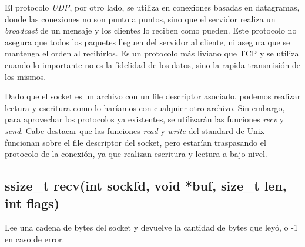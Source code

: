 \documentclass[oneside]{article}
\numberwithin{equation}{section}
\numberwithin{figure}{section}
\numberwithin{table}{section}
\begin{document}
		El protocolo \emph{UDP}, por otro lado, se utiliza en conexiones basadas en datagramas, donde las conexiones no son punto a puntos, sino que el servidor realiza un \emph{broadcast} de un mensaje y los clientes lo reciben como pueden. Este protocolo no asegura que todos los paquetes lleguen del servidor al cliente, ni asegura que se mantenga el orden al recibirlos. Es un protocolo más liviano que TCP y se utiliza cuando lo importante no es la fidelidad de los datos, sino la rapida transmisión de los mismos.
		
		Dado que el socket es un archivo con un file descriptor asociado, podemos realizar lectura y escritura como lo haríamos con cualquier otro archivo. Sin embargo, para aprovechar los protocolos ya existentes, se utilizarán las funciones \emph{recv} y \emph{send}. Cabe destacar que las funciones \emph{read} y \emph{write} del standard de Unix funcionan sobre el file descriptor del socket, pero estarían traspasando el protocolo de la conexión, ya que realizan escritura y lectura a bajo nivel. 

		\subsection{ssize\_t recv(int sockfd, void *buf, size\_t len, int flags)}
		Lee una cadena de bytes del socket y devuelve la cantidad de bytes que leyó, o -1 en caso de error.\\
\end{document}
